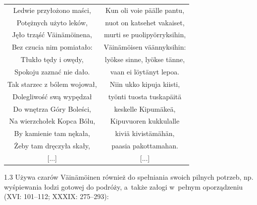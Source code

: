 \documentclass[11pt,a4paper,twoside]{report}
\begin{document}
\newpage
{\centering
\small
\begin{longtable}{c c}
Ledwie przyłożono maści, & Kun oli voie päälle pantu,\\
Potężnych użyto leków, & nuot on katsehet vakaiset,\\
Jęło trząść Väinämöinena, & murti se puolipyörryksihin,\\
Bez czucia nim pomiatało: & Väinämöisen väännyksihin:\\
Tłukło tędy i owędy, & lyökse sinne, lyökse tänne,\\
Spokoju zaznać nie dało. & vaan ei löytänyt lepoa.\\
Tak starzec z bólem wojował, & Niin ukko kipuja kiisti,\\
Dolegliwość swą wypędzał & työnti tuosta tuskapäitä\\
Do wnętrza Góry Boleści, & keskelle Kipumäkeä,\\
Na wierzchołek Kopca Bólu, & Kipuvuoren kukkulalle\\
By kamienie tam nękała, & kiviä kivistämähän,\\
Żeby tam dręczyła skały,& paasia pakottamahan.\\
{[...]} & {[...]}\\
\end{longtable}
}
\begin{spacing}{1.3}
Używa czarów Väinämöinen również do spełniania swoich pilnych potrzeb, np. wyśpiewania łodzi gotowej do podróży, a~także załogi w~pełnym oporządzeniu (XVI: 101--112; XXXIX: 275--293):
\end{spacing}
\end{document}
